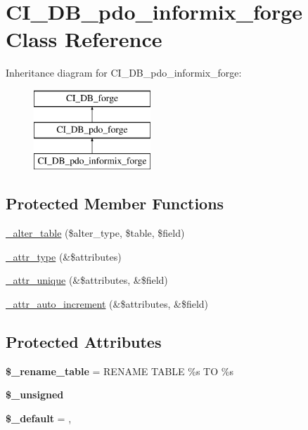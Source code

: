 \hypertarget{class_c_i___d_b__pdo__informix__forge}{}\section{C\+I\+\_\+\+D\+B\+\_\+pdo\+\_\+informix\+\_\+forge Class Reference}
\label{class_c_i___d_b__pdo__informix__forge}
Inheritance diagram for C\+I\+\_\+\+D\+B\+\_\+pdo\+\_\+informix\+\_\+forge\+:\begin{figure}[H]
\begin{center}
\leavevmode
\includegraphics[height=3.000000cm]{class_c_i___d_b__pdo__informix__forge}
\end{center}
\end{figure}
\subsection*{Protected Member Functions}
\begin{DoxyCompactItemize}
\item 
\mbox{\hyperlink{class_c_i___d_b__pdo__informix__forge_ab411019bc13729149cc54fa4bc5c61c8}{\+\_\+alter\+\_\+table}} (\$alter\+\_\+type, \$table, \$field)
\item 
\mbox{\hyperlink{class_c_i___d_b__pdo__informix__forge_a448269f499165c198c01dfe4e5948aea}{\+\_\+attr\+\_\+type}} (\&\$attributes)
\item 
\mbox{\hyperlink{class_c_i___d_b__pdo__informix__forge_a9331766a2c68e8ea5394cd5e1588b82f}{\+\_\+attr\+\_\+unique}} (\&\$attributes, \&\$field)
\item 
\mbox{\hyperlink{class_c_i___d_b__pdo__informix__forge_a472902d4ca5e2a87d2314d181c96ce61}{\+\_\+attr\+\_\+auto\+\_\+increment}} (\&\$attributes, \&\$field)
\end{DoxyCompactItemize}
\subsection*{Protected Attributes}
\begin{DoxyCompactItemize}
\item 
\mbox{\label{class_c_i___d_b__pdo__informix__forge_ab6900bb9a167b880296a854192df1054}} 
{\bfseries \$\+\_\+rename\+\_\+table} = \textquotesingle{}R\+E\+N\+A\+ME T\+A\+B\+LE \%s TO \%s\textquotesingle{}
\item 
{\bfseries \$\+\_\+unsigned}
\item 
\mbox{\label{class_c_i___d_b__pdo__informix__forge_a30c1f71e27d95083ca2c3d5fa06f7b6f}} 
{\bfseries \$\+\_\+default} = \textquotesingle{}, \textquotesingle{}
\end{DoxyCompactItemize}
